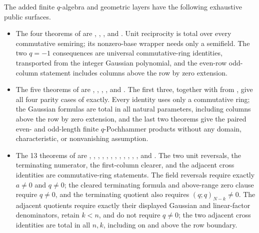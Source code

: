 \documentclass[11pt,a4paper,oneside,openany]{book}
\theoremstyle{definition}
\theoremstyle{remark}
\begin{document}
The added finite \(q\)-algebra and geometric layers have the following
exhaustive public surfaces.
\begin{itemize}
\item The four theorems of  are
,
,
, and
.  Unit reciprocity is
total over every commutative semiring; its nonzero-base wrapper needs only a
semifield.  The two \(q=-1\) consequences are universal commutative-ring
identities, transported from the integer Gaussian polynomial, and the
even-row odd-column statement includes columns above the row by zero
extension.

\item The five theorems of  are
,
,
,
, and
.  The first three, together
with
 from
, give all four parity cases of
 exactly.  Every identity uses only a commutative ring;
the Gaussian formulas are total in all natural parameters, including
columns above the row by zero extension, and the last two theorems give the
paired even- and odd-length finite $q$-Pochhammer products without any
domain, characteristic, or nonvanishing assumption.

\item The 13 theorems of
 are
,
,
,
,
,
,
,
,
,
,
,
, and
.  The two unit reversals,
the terminating numerator, the first-column clearer, and the adjacent cross
identities are commutative-ring statements.  The field reversals require
exactly \(a\ne0\) and \(q\ne0\); the cleared terminating formula and
above-range zero clause require \(q\ne0\), and the terminating quotient also
requires \((q;q)_{N-k}\ne0\).  The adjacent quotients require exactly their
displayed Gaussian and linear-factor denominators, retain \(k<n\), and do not
require \(q\ne0\); the two adjacent cross identities are total in all
\(n,k\), including on and above the row boundary.


\end{itemize}
\end{document}
